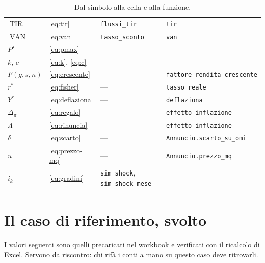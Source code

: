 \documentclass[11pt,a4paper]{article}
\theoremstyle{definition}
\theoremstyle{plain}
\DeclareMathOperator{\VAN}{VAN}
\DeclareMathOperator{\TIR}{TIR}
\begin{document}
\begin{table}[H]
\begin{tabular}{@{}llll@{}}
$\TIR$ & \eqref{eq:tir} & \texttt{flussi\_tir} & \texttt{tir} \\
$\VAN$ & \eqref{eq:van} & \texttt{tasso\_sconto} & \texttt{van} \\
$P^\star$ & \eqref{eq:pmax} & --- & --- \\
$k$, $c$ & \eqref{eq:k}, \eqref{eq:c} & --- & --- \\
$F(g,s,n)$ & \eqref{eq:crescente} & --- & \texttt{fattore\_rendita\_crescente} \\
$r^*$ & \eqref{eq:fisher} & --- & \texttt{tasso\_reale} \\
$Y^*$ & \eqref{eq:deflaziona} & --- & \texttt{deflaziona} \\
$\Delta_\pi$ & \eqref{eq:regalo} & --- & \texttt{effetto\_inflazione} \\
$\Lambda$ & \eqref{eq:rinuncia} & --- & \texttt{effetto\_inflazione} \\
$\delta$ & \eqref{eq:scarto} & --- & \texttt{Annuncio.scarto\_su\_omi} \\
$u$ & \eqref{eq:prezzo-mq} & --- & \texttt{Annuncio.prezzo\_mq} \\
$i_k$ & \eqref{eq:gradini} & \texttt{sim\_shock}, \texttt{sim\_shock\_mese} & --- \\
\bottomrule
\end{tabular}
\caption{Dal simbolo alla cella e alla funzione.}
\end{table}

\section{Il caso di riferimento, svolto}

I valori seguenti sono quelli precaricati nel workbook e verificati con il ricalcolo di Excel. Servono da riscontro: chi rifà i conti a mano su questo caso deve ritrovarli.
\end{document}
